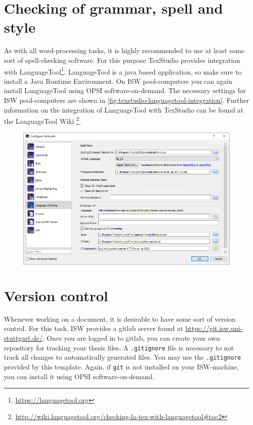 \section{Checking of grammar, spell and style}
\label{sec:spelling}
As with all word-processing tasks, it is highly recommended to use at least some sort of spell-checking software.
For this purpose TexStudio provides integration with LanguageTool\footnote{\url{https://languagetool.org}}. LanguageTool is a java based application, so make sure to install a Java Runtime Environment. On \ac{ISW} pool-computers you can again install LanguageTool using OPSI software-on-demand. The necessary settings for \ac{ISW} pool-computers are shown in \autoref{fig:texstudio-languagetool-integration}. Further information on the integration of LanguageTool with TexStudio can be found at the LanguageTool Wiki \footnote{\url{http://wiki.languagetool.org/checking-la-tex-with-languagetool\#toc2}}.

\begin{figure}
	\centering
	\includegraphics[width=0.9\linewidth]{example_images/texstudio-languagetool-integration}
	\caption[Settings for integrating LanguageTool with TexStudio on ISW computers]{}
	\label{fig:texstudio-languagetool-integration}
\end{figure}

\section{Version control}
\label{sec:version_control}
Whenever working on a document, it is desirable to have some sort of version control. For this task, \ac{ISW} provides a gitlab server found at \url{https://git.isw.uni-stuttgart.de/}. Once you are logged in to gitlab, you can create your own repository for tracking your thesis files. A \texttt{.gitignore} file is necessary to not track all changes to automatically generated files. You may use the \texttt{.gitignore} provided by this template. Again, if \texttt{git} is not installed on your \ac{ISW}-machine, you can install it using OPSI software-on-demand.

